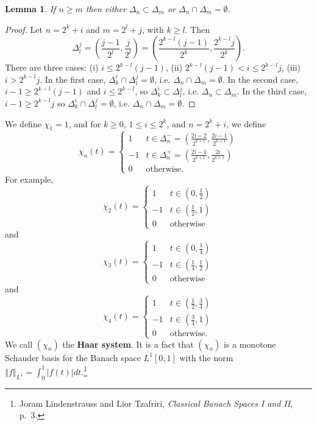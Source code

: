 \documentclass{article}
\newcommand{\norm}[1]{\left\Vert #1 \right\Vert}
\newtheorem{lemma}[theorem]{Lemma}
\theoremstyle{definition}
\begin{document}
\begin{lemma}
If $n \geq m$ then either $\Delta_n \subset \Delta_m$ or $\Delta_n \cap \Delta_m = \emptyset$.
\end{lemma}
\begin{proof}
Let
$n=2^k+i$ and $m=2^l+j$, with $k \geq l$.
Then
\[
\Delta_l^j = \left(\frac{j-1}{2^l},\frac{j}{2^l}\right)
=\left(\frac{2^{k-l}(j-1)}{2^k},\frac{2^{k-l}j}{2^k}\right).
\] 
There are three cases: 
(i) $i \leq 2^{k-l}(j-1)$,
(ii) $2^{k-l}(j-1)<i \leq 2^{k-l}j$,
(iii) $i>2^{k-l}j$. In the first
case, $\Delta_k^i \cap \Delta_l^j = \emptyset$,
i.e. $\Delta_n \cap \Delta_m = \emptyset$. 
 In the second case,
$i-1 \geq 2^{k-l}(j-1)$ and $i \leq 2^{k-l}$, so $\Delta_k^i \subset \Delta_l^j$, i.e.
$\Delta_n \subset \Delta_m$. 
In the third case, $i-1 \geq 2^{k-l}j$ so $\Delta_k^i \cap \Delta_l^j = \emptyset$, i.e. $\Delta_n \cap \Delta_m = \emptyset$. 
\end{proof}

We define $\chi_1=1$,
and for $k \geq 0$,  $1 \leq i \leq 2^k$, and  $n=2^k+i$, we define
\[
\chi_n(t)=\begin{cases}
1&t \in \Delta_n^- =  \left(\frac{2i-2}{2^{k+1}},\frac{2i-1}{2^{k+1}}\right)\\
-1&t \in \Delta_n^+ = \left(\frac{2i-1}{2^{k+1}},  \frac{2i}{2^{k+1}}\right)\\
0&\textrm{otherwise}.
\end{cases}
\]
For example,
\[
\chi_2(t) = 
\begin{cases}
1&t \in \left(0,\frac{1}{2}\right)\\
-1&t \in \left(\frac{1}{2},1\right)\\
0&\textrm{otherwise}
\end{cases}
\]
and
\[
\chi_3(t)
=\begin{cases}
1&t \in \left(0,\frac{1}{4}\right)\\
-1&t \in \left(\frac{1}{4},\frac{1}{2}\right)\\
0&\textrm{otherwise}
\end{cases}
\]
and
\[
\chi_4(t)
=\begin{cases}
1&t \in \left(\frac{1}{2},\frac{3}{4}\right)\\
-1&t \in \left(\frac{3}{4},1\right)\\
0&\textrm{otherwise}.
\end{cases}
\]
We call $(\chi_n)$ the \textbf{Haar system}. It is a fact that $(\chi_n)$ is a monotone Schauder basis for the Banach space
$L^1[0,1]$ with the norm $\norm{f}_{L^1}=\int_0^1 |f(t)| dt$.\footnote{Joram Lindenstrauss and Lior
Tzafriri, {\em Classical Banach Spaces I and II}, p.~3.}
\end{document}

